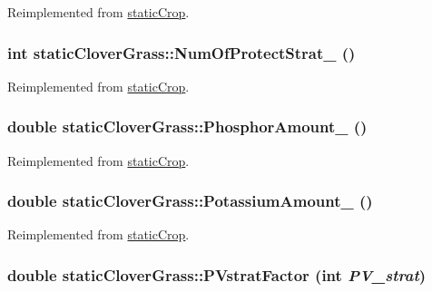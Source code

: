 Reimplemented from \hyperlink{classstatic_crop_a32b69ed138beaed150efa74d18e82d8e}{staticCrop}.\hypertarget{classstatic_clover_grass_a2361fc85251a91cf8f1d1c7930392323}{
\subsubsection[{NumOfProtectStrat\_\-}]{\setlength{\rightskip}{0pt plus 5cm}int staticCloverGrass::NumOfProtectStrat\_\- ()}}
\label{classstatic_clover_grass_a2361fc85251a91cf8f1d1c7930392323}


Reimplemented from \hyperlink{classstatic_crop_a4d3d767f569f48eb68ffa76822302467}{staticCrop}.\hypertarget{classstatic_clover_grass_a3ab4d1c458661d02bc92b991ce2e4c15}{
\subsubsection[{PhosphorAmount\_\-}]{\setlength{\rightskip}{0pt plus 5cm}double staticCloverGrass::PhosphorAmount\_\- ()}}
\label{classstatic_clover_grass_a3ab4d1c458661d02bc92b991ce2e4c15}


Reimplemented from \hyperlink{classstatic_crop_abaa5c59d4074d47dedc79172f8326e08}{staticCrop}.\hypertarget{classstatic_clover_grass_a4503f83751d06364054bc14d0b7221db}{
\subsubsection[{PotassiumAmount\_\-}]{\setlength{\rightskip}{0pt plus 5cm}double staticCloverGrass::PotassiumAmount\_\- ()}}
\label{classstatic_clover_grass_a4503f83751d06364054bc14d0b7221db}


Reimplemented from \hyperlink{classstatic_crop_a41fee98d728c7670e6acb504a9b3459d}{staticCrop}.\hypertarget{classstatic_clover_grass_a2eb39c57d3165893587edade1a470342}{
\subsubsection[{PVstratFactor}]{\setlength{\rightskip}{0pt plus 5cm}double staticCloverGrass::PVstratFactor (int {\em PV\_\-strat})}}
\label{classstatic_clover_grass_a2eb39c57d3165893587edade1a470342}



